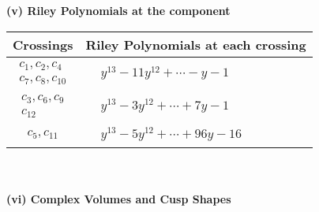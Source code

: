 \documentclass[1p]{elsarticle_modified}
\theoremstyle{definition}
\begin{document}
\newpage\renewcommand{\arraystretch}{1}
\flushleft \textbf{(v) Riley Polynomials at the component}\newline \\
\begin{tabular}{m{50pt}|m{274pt}}
Crossings & \hspace{64pt}Riley Polynomials at each crossing \\
\hline $$\begin{aligned}c_{1},c_{2},c_{4}\\c_{7},c_{8},c_{10}\end{aligned}$$&$\begin{aligned}
&y^{13}-11 y^{12}+\cdots- y-1
\end{aligned}$\\
\hline $$\begin{aligned}c_{3},c_{6},c_{9}\\c_{12}\end{aligned}$$&$\begin{aligned}
&y^{13}-3 y^{12}+\cdots+7 y-1
\end{aligned}$\\
\hline $$\begin{aligned}c_{5},c_{11}\end{aligned}$$&$\begin{aligned}
&y^{13}-5 y^{12}+\cdots+96 y-16
\end{aligned}$\\
\hline
\end{tabular}\\~\\
\newpage\flushleft \textbf{(vi) Complex Volumes and Cusp Shapes}
\end{document}
